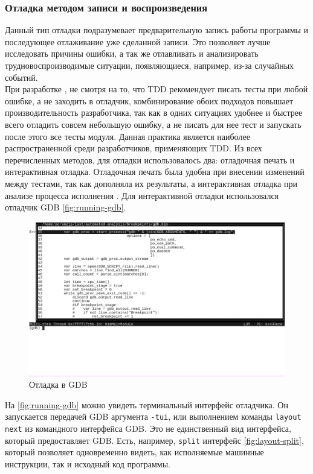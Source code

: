 \subsubsection{Отладка методом записи и воспроизведения}\label{sec:ch2/sec1/sub3/sub5}
Данный тип отладки подразумевает предварительную запись работы
программы и последующее отлаживание уже сделанной записи.
Это позволяет лучше исследовать причины ошибки, а так же отлавливать и анализировать
трудновоспроизводимые ситуации, появляющиеся, например, из-за случайных событий.
\\

При разработке {\ProgModule}, не смотря на то, что TDD рекомендует писать тесты
при любой ошибке, а не заходить в отладчик, комбинирование обоих подходов
повышает производительность разработчика, так как в одних ситуациях
удобнее и быстрее всего отладить совсем небольшую ошибку, а не писать для нее тест
и запускать после этого все тесты модуля. Данная практика является
наиболее распространенной среди разработчиков, применяющих TDD.
Из всех перечисленных методов, для отладки {\ProgModule} использовалось два: отладочная
печать и интерактивная отладка. Отладочная печать была удобна при внесении изменений
между тестами, так как дополняла их результаты, а интерактивная отладка при анализе
процесса исполнения {\ProgModule}. Для интерактивной отладки использовался отладчик 
GDB \autoref{fig:running-gdb}.

\begin{figure}[!hbtp]
    \includegraphics[width=\textwidth,height=\textheight,keepaspectratio]{images/running-gdb.png}
    \caption{Отладка {\ProgModule} в GDB\label{fig:running-gdb}}
\end{figure}

На \autoref{fig:running-gdb} можно увидеть терминальный интерфейс отладчика. Он
запускается передачей GDB аргумента \verb|-tui|, или выполнением команды 
\verb|layout next| из командного интерфейса GDB.
Это не единственный вид интерфейса, который предоставляет GDB.
Есть, например, \verb|split| интерфейс \autoref{fig:layout-split},
который позволяет одновременно видеть, как исполняемые машинные инструкции,
так и исходный код программы.

